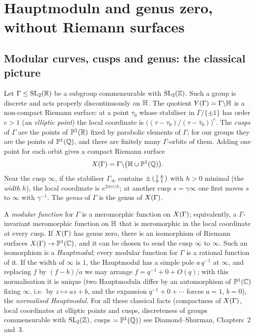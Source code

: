 \section{Hauptmoduln and genus zero, without Riemann surfaces}\label{ch16:sec:haupt}

\subsection{Modular curves, cusps and genus: the classical picture}

Let $\Gamma\le\mathrm{SL}_2(\mathbb{R})$ be a subgroup commensurable with $\mathrm{SL}_2(\mathbb{Z})$.  Such a group is discrete and acts
properly discontinuously on $\mathbb{H}$.  The quotient $Y(\Gamma)=\Gamma\backslash\mathbb{H}$ is a non-compact
Riemann surface: at a point $\tau_0$ whose stabiliser in $\Gamma/\{\pm1\}$ has order $e>1$ (an \emph{elliptic point})
the local coordinate is $\bigl((\tau-\tau_0)/(\tau-\bar\tau_0)\bigr)^e$.  The \emph{cusps} of $\Gamma$ are the points of
$\mathbb{P}^1(\mathbb{R})$ fixed by parabolic elements of $\Gamma$; for our groups they are the points of $\mathbb{P}^1({\mathbb{Q}})$, and
there are finitely many $\Gamma$-orbits of them.  Adding one point for each orbit gives a compact Riemann surface
\begin{equation*}
  X(\Gamma)=\Gamma\backslash\bigl(\mathbb{H}\cup\mathbb{P}^1({\mathbb{Q}})\bigr).
\end{equation*}
Near the cusp $\infty$, if the stabiliser $\Gamma_\infty$ contains $\pm\left(\begin{smallmatrix}1&h\\0&1\end{smallmatrix}\right)$ with $h>0$ minimal (the
\emph{width} $h$), the local coordinate is $e^{2\pi i\tau/h}$; at another cusp $s=\gamma\infty$ one first moves $s$ to
$\infty$ with $\gamma^{-1}$.  The \emph{genus} of $\Gamma$ is the genus of $X(\Gamma)$.

A \emph{modular function} for $\Gamma$ is a meromorphic function on $X(\Gamma)$; equivalently, a $\Gamma$-invariant
meromorphic function on $\mathbb{H}$ that is meromorphic in the local coordinate at every cusp.  If $X(\Gamma)$
has genus zero, there is an isomorphism of Riemann surfaces $X(\Gamma)\to\mathbb{P}^1({\mathbb{C}})$, and it can be chosen to
send the cusp $\infty$ to $\infty$.  Such an isomorphism is a \emph{Hauptmodul}; every modular function for $\Gamma$ is
a rational function of it.  If the width of $\infty$ is $1$, the Hauptmodul has a simple pole $a\,q^{-1}$ at $\infty$,
and replacing $f$ by $(f-b)/a$ we may arrange $f=q^{-1}+0+O(q)$; with this normalisation it is unique (two
Hauptmoduln differ by an automorphism of $\mathbb{P}^1({\mathbb{C}})$ fixing $\infty$, i.e.\ by $z\mapsto az+b$, and the
expansion $q^{-1}+0+\cdots$ forces $a=1$, $b=0$), the \emph{normalised Hauptmodul}.  For all these classical facts
(compactness of $X(\Gamma)$, local coordinates at elliptic points and cusps, discreteness of groups commensurable
with $\mathrm{SL}_2(\mathbb{Z})$, cusps $=\mathbb{P}^1({\mathbb{Q}})$) see Diamond--Shurman, Chapters~2 and~3.

